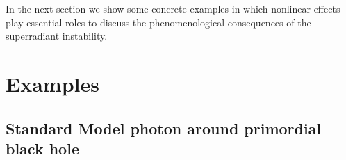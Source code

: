 \documentclass[%
 preprint,
 nofootinbib,
 amsmath,amssymb,
 aps,
 a4paper
]{revtex4-1}
\begin{document}
In the next section we show some concrete examples in which nonlinear effects play essential roles to discuss the phenomenological consequences of the superradiant instability.




\section{Examples}   \label{sec:app}


\subsection{Standard Model photon around primordial black hole}  \label{sec:SM}
\end{document}
